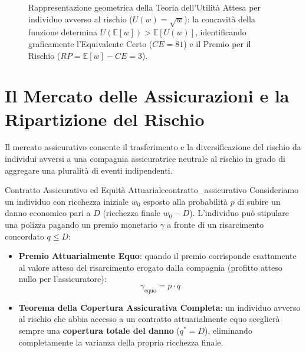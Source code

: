 \begin{figure}[htbp]
\caption{Rappresentazione geometrica della Teoria dell'Utilità Attesa per individuo avverso al rischio ($U(w) = \sqrt{w}$): la concavità della funzione determina $U(\mathbb{E}[w]) > \mathbb{E}[U(w)]$, identificando graficamente l'Equivalente Certo ($CE = 81$) e il Premio per il Rischio ($RP = \mathbb{E}[w] - CE = 3$).}
\label{fig:utilita_attesa_avversione_rischio}
\end{figure}

\section{Il Mercato delle Assicurazioni e la Ripartizione del Rischio}

Il mercato assicurativo consente il trasferimento e la diversificazione del rischio da individui avversi a una compagnia assicuratrice neutrale al rischio in grado di aggregare una pluralità di eventi indipendenti.

\begin{definizione}{Contratto Assicurativo ed Equità Attuariale}{contratto_assicurativo}
Consideriamo un individuo con ricchezza iniziale $w_0$ esposto alla probabilità $p$ di subire un danno economico pari a $D$ (ricchezza finale $w_0 - D$). L'individuo può stipulare una polizza pagando un premio monetario $\gamma$ a fronte di un risarcimento concordato $q \le D$:
\begin{itemize}
    \item \textbf{Premio Attuarialmente Equo}: quando il premio corrisponde esattamente al valore atteso del risarcimento erogato dalla compagnia (profitto atteso nullo per l'assicuratore):
    \begin{equation}
        \gamma_{\text{equo}} = p \cdot q
    \end{equation}
    \item \textbf{Teorema della Copertura Assicurativa Completa}: un individuo avverso al rischio che abbia accesso a un contratto attuarialmente equo sceglierà sempre una \textbf{copertura totale del danno} ($q^* = D$), eliminando completamente la varianza della propria ricchezza finale.
\end{itemize}
\end{definizione}

